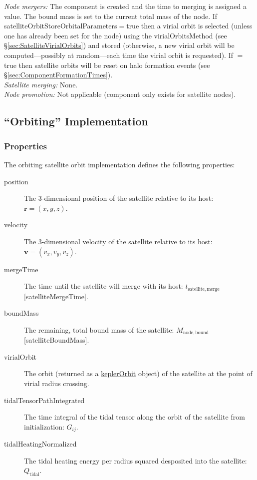 \noindent\emph{Node mergers:} The \gls{component} is created and the time to merging is assigned a value. The bound mass is set to the current total mass of the node. If {\normalfont \ttfamily satelliteOrbitStoreOrbitalParameters}$=${\normalfont \ttfamily true} then a virial orbit is selected (unless one has already been set for the node) using the {\normalfont \ttfamily virialOrbitsMethod} (see \S\ref{sec:SatelliteVirialOrbits}) and stored (otherwise, a new virial orbit will be computed---possibly at random---each time the virial orbit is requested). If {\normalfont \ttfamily [satelliteOrbitResetOnHaloFormation]}$=${\normalfont \ttfamily true} then satellite orbits will be reset on halo formation events (see \S\ref{sec:ComponentFormationTimes}).\\

\noindent\emph{Satellite merging:} None.\\

\noindent\emph{Node promotion:} Not applicable (component only exists for satellite nodes).\\

\subsection{``Orbiting'' Implementation}\label{sec:ComponentSatelliteOrbiting}

\subsubsection{Properties}

The orbiting satellite orbit implementation defines the following properties:
\begin{description}
 \item [{\normalfont \ttfamily position}] The 3-dimensional position of the satellite relative to its host: $\mathbf{r}=(x,y,z)$.
 \item [{\normalfont \ttfamily velocity}] The 3-dimensional velocity of the satellite relative to its host: $\mathbf{v}=(v_x,v_y,v_z)$.
 \item [{\normalfont \ttfamily mergeTime}] The time until the satellite will merge with its host: $t_\mathrm{satellite, merge}$ [{\normalfont \ttfamily satelliteMergeTime}].
 \item [{\normalfont \ttfamily boundMass}] The remaining, total bound mass of the satellite: $M_\mathrm{node,bound}$ [{\normalfont \ttfamily satelliteBoundMass}].
 \item[{\normalfont \ttfamily virialOrbit}] The orbit (returned as a \href{https://github.com/galacticusorg/galacticus/releases/download/masterRelease/Galacticus_Development.pdf\#sec.KeplerOrbits}{\normalfont \ttfamily keplerOrbit} object) of the satellite at the point of virial radius crossing.
 \item[{\normalfont \ttfamily tidalTensorPathIntegrated}] The time integral of the tidal tensor along the orbit of the satellite from initialization: $G_{ij}$.
 \item[{\normalfont \ttfamily tidalHeatingNormalized}] The tidal heating energy per radius squared desposited into the satellite: $Q_\mathrm{tidal}$.
\end{description}

